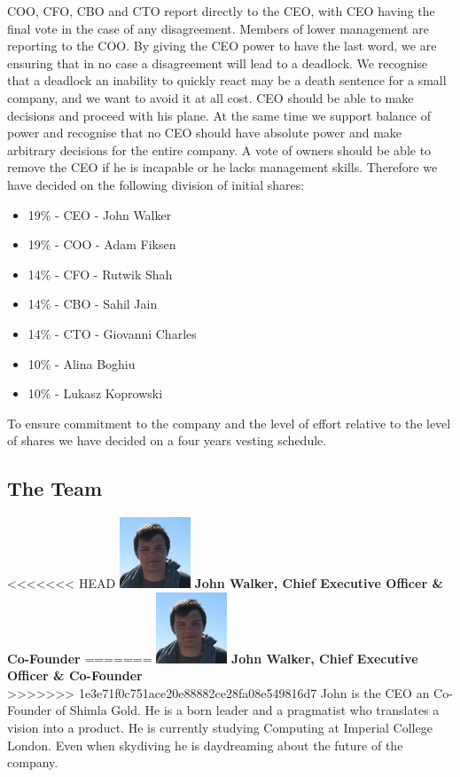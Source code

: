 \documentclass[11pt]{article}
\begin{document}
  COO, CFO, CBO and CTO report directly to the CEO, with CEO having the final vote in the case of any disagreement.
  Members of lower management are reporting to the COO.
  By giving the CEO power to have the last word, we are ensuring that in no case a disagreement will lead to a deadlock.
  We recognise that a deadlock an inability to quickly react may be a death sentence for a small company, and we want to avoid it at all cost.
  CEO should be able to make decisions and proceed with his plane.
  At the same time we support balance of power and recognise that no CEO should have absolute power and make arbitrary decisions for the entire company.
  A vote of owners should be able to remove the CEO if he is incapable or he lacks management skills.
  Therefore we have decided on the following division of initial shares:

  \begin{itemize}
  \item19\% - CEO - John Walker
  \item19\% - COO - Adam Fiksen
  \item14\% - CFO - Rutwik Shah
  \item14\% - CBO - Sahil Jain
  \item14\% - CTO - Giovanni Charles
  \item10\% - Alina Boghiu
  \item10\% - Lukasz Koprowski
  \end{itemize}

  To ensure commitment to the company and the level of effort relative to the level of shares we have decided on a four years vesting schedule.

  \subsection{The Team}
<<<<<<< HEAD
  \includegraphics[width=80px]{john.jpg} \textbf{John Walker, Chief Executive Officer \& Co-Founder}
=======
  \includegraphics[width=80px]{john.jpg} \textbf{John Walker, Chief Executive Officer \& Co-Founder}\\
>>>>>>> 1e3e71f0c751ace20e88882ce28fa08e549816d7
  John is the CEO an Co-Founder of Shimla Gold.
  He is a born leader and a pragmatist who translates a vision into a product.
  He is currently studying Computing at Imperial College London.
  Even when skydiving he is daydreaming about the future of the company.
\end{document}
